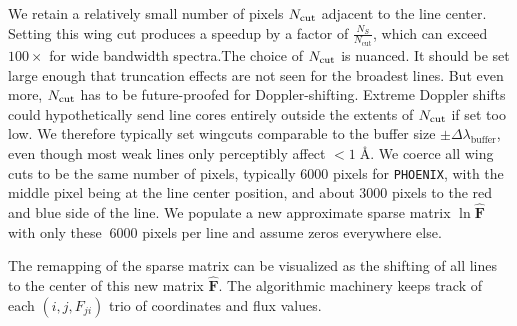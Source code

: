 \documentclass[modern]{aastex631}
\begin{document}
We retain a relatively small number of pixels $N_{\rm cut}$ adjacent to the line center. Setting this wing cut produces a speedup by a factor of $\frac{N_S}{N_{\mathrm{cut}}}$, which can exceed $100\times$ for wide bandwidth spectra.The choice of $N_{\rm cut}$ is nuanced.  It should be set large enough that truncation effects are not seen for the broadest lines.  But even more, $N_{\rm cut}$ has to be future-proofed for Doppler-shifting. Extreme Doppler shifts could hypothetically send line cores entirely outside the extents of $N_{\rm cut}$ if set too low.  We therefore typically set wingcuts comparable to the buffer size $\pm \Delta \lambda_{\mathrm{buffer}}$, even though most weak lines only perceptibly affect $<1\;$\AA. We coerce all wing cuts to be the same number of pixels, typically 6000 pixels for \texttt{PHOENIX}, with the middle pixel being at the line center position, and about 3000 pixels to the red and blue side of the line. We populate a new approximate sparse matrix $\ln{\bm{\hat{F}}}$ with only these $~6000$ pixels per line and assume zeros everywhere else.

The remapping of the sparse matrix can be visualized as the shifting of all lines to the center of this new matrix $\bm{\hat{F}}$.  The algorithmic machinery keeps track of each $(i, j, F_{ji})$ trio of coordinates and flux values.
\end{document}
